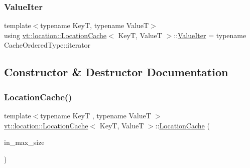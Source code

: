\mbox{\label{structvt_1_1location_1_1_location_cache_a67dc1e71785f1c8aa3b1e02d802977b8}} 
\subsubsection{\texorpdfstring{Value\+Iter}{ValueIter}}
{\footnotesize\ttfamily template$<$typename KeyT, typename ValueT$>$ \\
using \hyperlink{structvt_1_1location_1_1_location_cache}{vt\+::location\+::\+Location\+Cache}$<$ KeyT, ValueT $>$\+::\hyperlink{structvt_1_1location_1_1_location_cache_a67dc1e71785f1c8aa3b1e02d802977b8}{Value\+Iter} =  typename Cache\+Ordered\+Type\+::iterator}



\subsection{Constructor \& Destructor Documentation}
\mbox{\label{structvt_1_1location_1_1_location_cache_a5a43f6d320c5b23dbb819e9bc74deeeb}} 
\subsubsection{\texorpdfstring{Location\+Cache()}{LocationCache()}\hspace{0.1cm}{\footnotesize\ttfamily [1/3]}}
{\footnotesize\ttfamily template$<$typename KeyT , typename ValueT $>$ \\
\hyperlink{structvt_1_1location_1_1_location_cache}{vt\+::location\+::\+Location\+Cache}$<$ KeyT, ValueT $>$\+::\hyperlink{structvt_1_1location_1_1_location_cache}{Location\+Cache} (\begin{DoxyParamCaption}\item[{\hyperlink{namespacevt_1_1location_ab1c4c5849012a23eee2fbd1fce6159d7}{Location\+Size\+Type} const \&}]{in\+\_\+max\+\_\+size }\end{DoxyParamCaption})\hspace{0.3cm}{\ttfamily [explicit]}}

